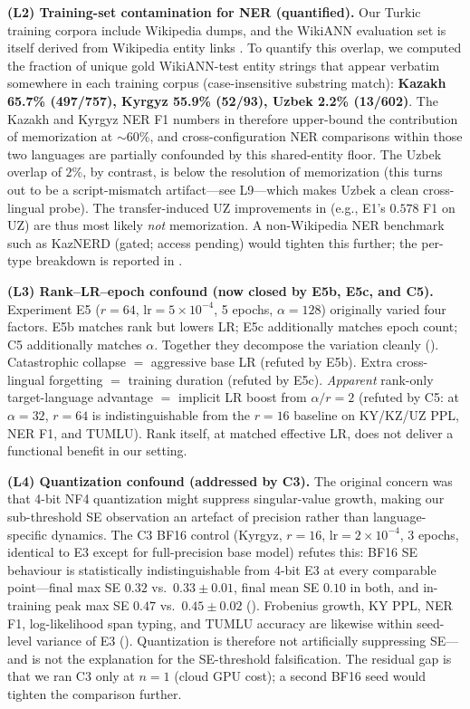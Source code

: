 \documentclass[11pt]{article}
\begin{document}
\textbf{(L2) Training-set contamination for NER (quantified).} Our Turkic training corpora include Wikipedia dumps, and the WikiANN evaluation set is itself derived from Wikipedia entity links \cite{pan2017cross}. To quantify this overlap, we computed the fraction of unique gold WikiANN-test entity strings that appear verbatim somewhere in each training corpus (case-insensitive substring match): \textbf{Kazakh 65.7\% (497/757), Kyrgyz 55.9\% (52/93), Uzbek 2.2\% (13/602)}. The Kazakh and Kyrgyz NER F1 numbers in  therefore upper-bound the contribution of memorization at $\sim$60\%, and cross-configuration NER comparisons within those two languages are partially confounded by this shared-entity floor. The Uzbek overlap of $2\%$, by contrast, is below the resolution of memorization (this turns out to be a script-mismatch artifact---see L9---which makes Uzbek a clean cross-lingual probe). The transfer-induced UZ improvements in  (e.g., E1's $0.578$ F1 on UZ) are thus most likely \emph{not} memorization. A non-Wikipedia NER benchmark such as KazNERD \cite{yeshpanov2022kaznerd} (gated; access pending) would tighten this further; the per-type breakdown is reported in .

\textbf{(L3) Rank--LR--epoch confound (now closed by E5b, E5c, and C5).} Experiment E5 ($r{=}64$, $\text{lr}{=}5\times 10^{-4}$, 5 epochs, $\alpha{=}128$) originally varied four factors. E5b matches rank but lowers LR; E5c additionally matches epoch count; C5 additionally matches $\alpha$. Together they decompose the variation cleanly (). Catastrophic collapse $=$ aggressive base LR (refuted by E5b). Extra cross-lingual forgetting $=$ training duration (refuted by E5c). \emph{Apparent} rank-only target-language advantage $=$ implicit LR boost from $\alpha/r=2$ (refuted by C5: at $\alpha{=}32$, $r{=}64$ is indistinguishable from the $r{=}16$ baseline on KY/KZ/UZ PPL, NER F1, and TUMLU). Rank itself, at matched effective LR, does not deliver a functional benefit in our setting.

\textbf{(L4) Quantization confound (addressed by C3).} The original concern was that 4-bit NF4 quantization might suppress singular-value growth, making our sub-threshold SE observation an artefact of precision rather than language-specific dynamics. The C3 BF16 control (Kyrgyz, $r{=}16$, $\text{lr}{=}2\times 10^{-4}$, 3 epochs, identical to E3 except for full-precision base model) refutes this: BF16 SE behaviour is statistically indistinguishable from 4-bit E3 at every comparable point---final max SE $0.32$ vs.\ $0.33 \pm 0.01$, final mean SE $0.10$ in both, and in-training peak max SE $0.47$ vs.\ $0.45 \pm 0.02$ (). Frobenius growth, KY PPL, NER F1, log-likelihood span typing, and TUMLU accuracy are likewise within seed-level variance of E3 (). Quantization is therefore not artificially suppressing SE---and is not the explanation for the SE-threshold falsification. The residual gap is that we ran C3 only at $n{=}1$ (cloud GPU cost); a second BF16 seed would tighten the comparison further.
\end{document}
